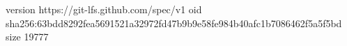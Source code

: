 version https://git-lfs.github.com/spec/v1
oid sha256:63bdd8292fea5691521a32972fd47b9b9e58fe984b40afc1b7086462f5a5f5bd
size 19777
